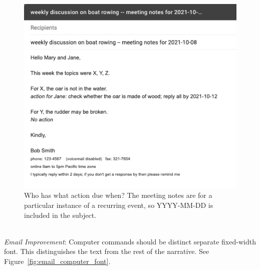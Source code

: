 \begin{figure}
\includegraphics[width=1\textwidth]{images/email_meeting_notes.pdf}
\caption{Who has what action due when? The meeting notes are for a particular instance of a recurring event, so YYYY-MM-DD is included in the subject.}
\label{fig:email_meeting_notes}
\end{figure}

\ \\
\textit{Email Improvement}: Computer commands should be distinct separate fixed-width font. This distinguishes the text from the rest of the narrative.  See Figure~\ref{fig:email_computer_font}.


